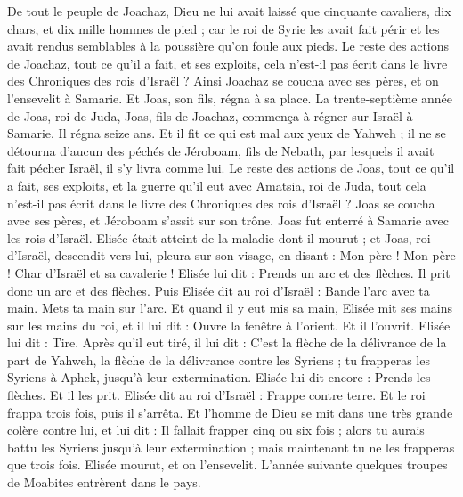 \begin{multicols}{2}
De tout le peuple de Joachaz, Dieu ne lui avait laissé que cinquante cavaliers, dix chars, et dix mille hommes de pied ; car le roi de Syrie les avait fait périr et les avait rendus semblables à la poussière qu’on foule aux pieds.
Le reste des actions de Joachaz, tout ce qu’il a fait, et ses exploits, cela n’est-il pas écrit dans le livre des Chroniques des rois d’Israël ?
Ainsi Joachaz se coucha avec ses pères, et on l’ensevelit à Samarie. Et Joas, son fils, régna à sa place.
La trente-septième année de Joas, roi de Juda, Joas, fils de Joachaz, commença à régner sur Israël à Samarie. Il régna seize ans.
Et il fit ce qui est mal aux yeux de Yahweh ; il ne se détourna d’aucun des péchés de Jéroboam, fils de Nebath, par lesquels il avait fait pécher Israël, il s’y livra comme lui.
Le reste des actions de Joas, tout ce qu’il a fait, ses exploits, et la guerre qu’il eut avec Amatsia, roi de Juda, tout cela n’est-il pas écrit dans le livre des Chroniques des rois d’Israël ?
Joas se coucha avec ses pères, et Jéroboam s’assit sur son trône. Joas fut enterré à Samarie avec les rois d’Israël.
Elisée était atteint de la maladie dont il mourut ; et Joas, roi d’Israël, descendit vers lui, pleura sur son visage, en disant : Mon père ! Mon père ! Char d’Israël et sa cavalerie !
Elisée lui dit : Prends un arc et des flèches. Il prit donc un arc et des flèches.
Puis Elisée dit au roi d’Israël : Bande l’arc avec ta main. Mets ta main sur l’arc. Et quand il y eut mis sa main, Elisée mit ses mains sur les mains du roi,
et il lui dit : Ouvre la fenêtre à l’orient. Et il l’ouvrit. Elisée lui dit : Tire. Après qu’il eut tiré, il lui dit : C’est la flèche de la délivrance de la part de Yahweh, la flèche de la délivrance contre les Syriens ; tu frapperas les Syriens à Aphek, jusqu’à leur extermination.
Elisée lui dit encore : Prends les flèches. Et il les prit. Elisée dit au roi d’Israël : Frappe contre terre. Et le roi frappa trois fois, puis il s’arrêta.
Et l’homme de Dieu se mit dans une très grande colère contre lui, et lui dit : Il fallait frapper cinq ou six fois ; alors tu aurais battu les Syriens jusqu’à leur extermination ; mais maintenant tu ne les frapperas que trois fois.
Elisée mourut, et on l’ensevelit. L’année suivante quelques troupes de Moabites entrèrent dans le pays.

\end{multicols}

